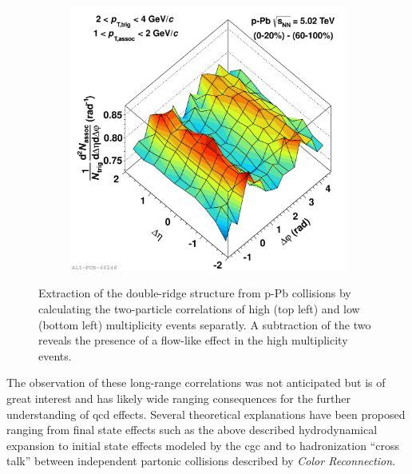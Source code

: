 \begin{figure}
\begin{subfigure}[m]{.4\textwidth}
\begin{subfigure}[b]{\textwidth}
    \end{subfigure}
  \end{subfigure}%
  \begin{subfigure}[m]{.6\textwidth}
    \includegraphics[width=\textwidth]{figures/ty_sub_exampel.pdf}
  \end{subfigure}
  \caption[Extraction of the double-ridge structure from p-Pb collisions.]{Extraction of the double-ridge structure from p-Pb collisions by calculating the two-particle correlations of high (top left) and low (bottom left) multiplicity events separatly. A subtraction of the two reveals the presence of a flow-like effect in the high multiplicity events.}
  \label{fig:double_ridge_pPb}
\end{figure}

The observation of these long-range \deta correlations was not anticipated but is of great interest and has likely wide ranging consequences for the further understanding of \gls{qcd} effects. Several theoretical explanations have been proposed ranging from final state effects such as the above described hydrodynamical expansion to initial state effects modeled by the \gls{cgc} and to hadronization ``cross talk'' between independent partonic collisions described by \emph{Color Reconnection}.


